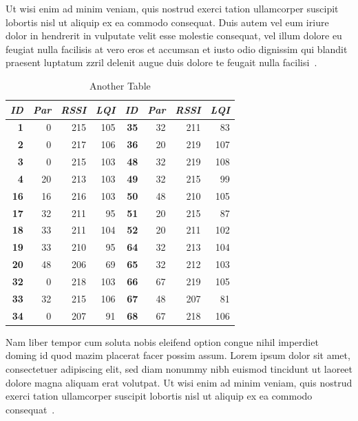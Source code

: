 Ut wisi enim ad minim veniam, quis nostrud exerci tation ullamcorper suscipit
lobortis nisl ut aliquip ex ea commodo consequat. Duis autem vel eum iriure
dolor in hendrerit in vulputate velit esse molestie consequat, vel illum dolore
eu feugiat nulla facilisis at vero eros et accumsan et iusto odio dignissim qui
blandit praesent luptatum zzril delenit augue duis dolore te feugait nulla
facilisi~\cite{cti:m2dd}.

\begin{table}
\begin{center}
\begin{tabular}{|r|r|r|r||r|r|r|r|}
\hline \textbf{\textit{ID}} & \textbf{\textit{Par}} & \textbf{\textit{RSSI}} &
\textbf{\textit{LQI}} &
\textbf{\textit{ID}} & \textbf{\textit{Par}} & \textbf{\textit{RSSI}} & \textbf{\textit{LQI}} \\
\hline \hline
\textbf{1}  &  0 & 215 & 105 & \textbf{35} & 32 & 211 &  83 \\
\textbf{2}  &  0 & 217 & 106 & \textbf{36} & 20 & 219 & 107 \\
\textbf{3}  &  0 & 215 & 103 & \textbf{48} & 32 & 219 & 108 \\
\textbf{4}  & 20 & 213 & 103 & \textbf{49} & 32 & 215 &  99 \\
\textbf{16} & 16 & 216 & 103 & \textbf{50} & 48 & 210 & 105 \\
\textbf{17} & 32 & 211 &  95 & \textbf{51} & 20 & 215 &  87 \\
\textbf{18} & 33 & 211 & 104 & \textbf{52} & 20 & 211 & 102 \\
\textbf{19} & 33 & 210 &  95 & \textbf{64} & 32 & 213 & 104 \\
\textbf{20} & 48 & 206 &  69 & \textbf{65} & 32 & 212 & 103 \\
\textbf{32} &  0 & 218 & 103 & \textbf{66} & 67 & 219 & 105 \\
\textbf{33} & 32 & 215 & 106 & \textbf{67} & 48 & 207 &  81 \\
\textbf{34} &  0 & 207 &  91 & \textbf{68} & 67 & 218 & 106 \\
\hline
\end{tabular}
\caption{Another Table}
\end{center}
\end{table}

Nam liber tempor cum soluta nobis eleifend option congue nihil imperdiet doming
id quod mazim placerat facer possim assum. Lorem ipsum dolor sit amet,
consectetuer adipiscing elit, sed diam nonummy nibh euismod tincidunt ut laoreet
dolore magna aliquam erat volutpat. Ut wisi enim ad minim veniam, quis nostrud
exerci tation ullamcorper suscipit lobortis nisl ut aliquip ex ea commodo
consequat~\cite{cti:sgds}.

